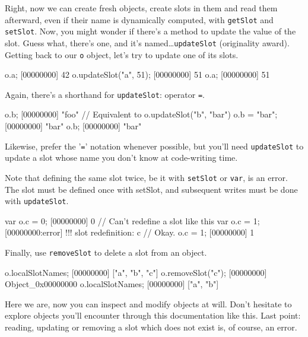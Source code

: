 Right, now we can create fresh objects, create slots in them and read
them afterward, even if their name is dynamically computed, with
\lstinline{getSlot} and \lstinline{setSlot}. Now, you might wonder if
there's a method to update the value of the slot. Guess what, there's
one, and it's named\ldots \lstinline{updateSlot} (originality
award). Getting back to our \lstinline{o} object, let's try to update one
of its slots.

\begin{urbiscript}[firstnumber=last]
o.a;
[00000000] 42
o.updateSlot("a", 51);
[00000000] 51
o.a;
[00000000] 51
\end{urbiscript}

Again, there's a shorthand for \lstinline{updateSlot}: operator
\lstinline{=}.

\begin{urbiscript}[firstnumber=last]
o.b;
[00000000] "foo"
// Equivalent to o.updateSlot("b", "bar")
o.b = "bar";
[00000000] "bar"
o.b;
[00000000] "bar"
\end{urbiscript}

Likewise, prefer the '\lstinline{=}' notation whenever
possible, but you'll need \lstinline{updateSlot} to update a slot whose
name you don't know at code-writing time.

Note that defining the same slot twice, be it with \lstinline{setSlot} or
\lstinline{var}, is an error. The slot must be defined once with setSlot,
and subsequent writes must be done with \lstinline{updateSlot}.

\begin{urbiscript}[firstnumber=last]
var o.c = 0;
[00000000] 0
// Can't redefine a slot like this
var o.c = 1;
[00000000:error] !!! slot redefinition: c
// Okay.
o.c = 1;
[00000000] 1
\end{urbiscript}

Finally, use \lstinline{removeSlot} to delete a slot from an object.

\begin{urbiscript}[firstnumber=last]
o.localSlotNames;
[00000000] ["a", "b", "c"]
o.removeSlot("c");
[00000000] Object_0x00000000
o.localSlotNames;
[00000000] ["a", "b"]
\end{urbiscript}

Here we are, now you can inspect and modify objects at will. Don't
hesitate to explore \us objects you'll encounter through this
documentation like this. Last point: reading, updating or removing a
slot which does not exist is, of course, an error.

